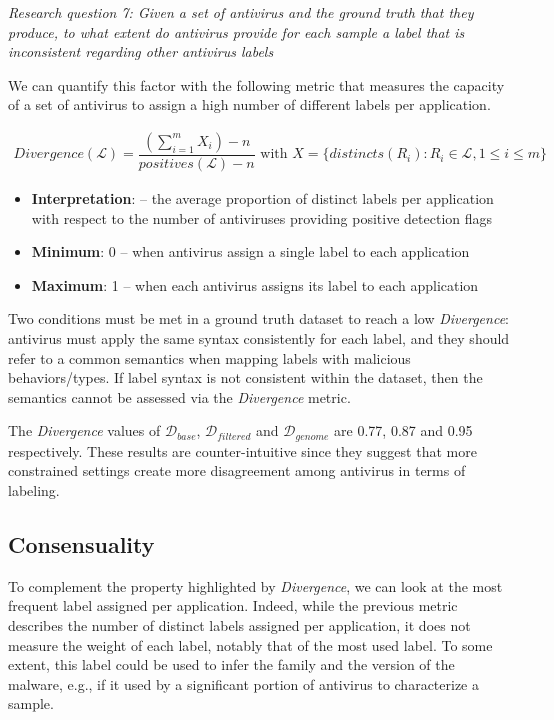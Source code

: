 \begin{mdframed}[roundcorner=10pt,nobreak]
	{\em Research question 7: Given a set of antivirus and the ground truth that they produce, to what extent do antivirus provide for each sample a label that is inconsistent regarding other antivirus labels}
\end{mdframed}

We can quantify this factor with the following metric that measures the capacity of a set of antivirus to assign a high number of different labels per application.

\begin{mdframed}[hidealllines=true,nobreak=true]
\begin{gather*}
	Divergence(\mathcal{L}) = \dfrac{(\sum_{i=1}^m X_i) - n}{positives(\mathcal{L}) - n} \text{ with }
	X = \{distincts(R_i) : R_i \in \mathcal{L}, 1 \leq i \leq m\}
\end{gather*}

\begin{itemize}
	\item{\textbf{Interpretation}}: -- the average proportion of distinct labels per application with respect to the number of antiviruses providing positive detection flags
	\item{\textbf{Minimum}}: 0 -- when antivirus assign a single label to each application
	\item{\textbf{Maximum}}: 1 -- when each antivirus assigns its label to each application
\end{itemize}
\end{mdframed}

Two conditions must be met in a ground truth dataset to reach a low \emph{Divergence}: antivirus must apply the same syntax consistently for each label, and they should refer to a common semantics when mapping labels with malicious behaviors/types.
If label syntax is not consistent within the dataset, then the semantics cannot be assessed via the \emph{Divergence} metric.

The \emph{Divergence} values of $\mathcal{D}_{base}$, $\mathcal{D}_{filtered}$ and $\mathcal{D}_{genome}$ are 0.77, 0.87 and 0.95 respectively.
These results are counter-intuitive since they suggest that more constrained settings create more disagreement among antivirus in terms of labeling.
\subsection{Consensuality}
To complement the property highlighted by \emph{Divergence}, we can look at the most frequent label assigned per application.
Indeed, while the previous metric describes the number of distinct labels assigned per application, it does not measure the weight of each label, notably that of the most used label.
To some extent, this label could be used to infer the family and the version of the malware, e.g., if it used by a significant portion of antivirus to characterize a sample.

